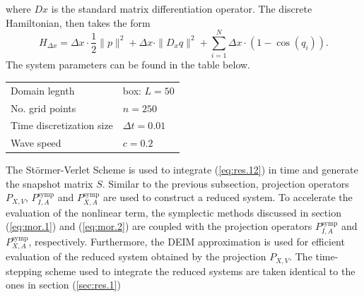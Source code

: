 where $Dx$ is the standard matrix differentiation operator. The discrete Hamiltonian, then takes the form
\begin{equation}
	H_{\Delta x} = \Delta x \cdot \frac 1 2 \| p \|^2 + \Delta x \cdot \| D_x q \|^2 + \sum_{i=1}^{N} \Delta x \cdot ( 1 - \cos(q_i) ).
\end{equation}
The system parameters can be found in the table below.
\vspace{0.5cm}
\begin{center}
\begin{tabular}{|l|l|}
\hline
Domain legnth & box: $L = 50$ \\
No. grid points & $n = 250$ \\
Time discretization size & $\Delta t = 0.01$ \\
Wave speed & $c=0.2$ \\
\hline
\end{tabular}
\end{center}
\vspace{0.5cm}

The St\"ormer-Verlet Scheme is used to integrate (\ref{eq:res.12}) in time and generate the snapshot matrix $S$. Similar to the previous subsection, projection operators $P_{X,V}$, $P^{\text{symp}}_{I,A}$ and $P^{\text{symp}}_{X,A}$ are used to construct a reduced system. To accelerate the evaluation of the nonlinear term, the symplectic methods discussed in section (\ref{eq:mor.1}) and (\ref{eq:mor.2}) are coupled with the projection operators $P^{\text{symp}}_{I,A}$ and $P^{\text{symp}}_{X,A}$, respectively. Furthermore, the DEIM approximation is used for efficient evaluation of the reduced system obtained by the projection $P_{X,V}$. The time-stepping scheme used to integrate the reduced systems are taken identical to the ones in section (\ref{sec:res.1})
